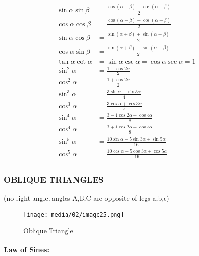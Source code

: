 \documentclass[
]{book}
\begin{document}
\begin{align}
\sin{\alpha}\sin{\beta} &= \frac{\cos\left(\alpha - \beta\right) - \cos\left(\alpha + \beta\right)}{2}\\
\cos{\alpha}\cos{\beta} &= \frac{\cos\left(\alpha - \beta\right) + \cos\left(\alpha + \beta\right)}{2}\\
\sin{\alpha}\cos{\beta} &= \frac{\sin\left(\alpha + \beta\right) + \sin\left(\alpha - \beta\right)}{2}\\
\cos{\alpha}\sin{\beta} &= \frac{\sin\left(\alpha + \beta\right) - \sin\left(\alpha - \beta\right)}{2}\\
\tan{\alpha}\cot{\alpha} &= \sin{\alpha}\csc{\alpha} = \cos{\alpha}\sec{\alpha} = 1\\
\sin^2{\alpha} &= \frac{1 - \cos{2\alpha}}{2}\\
\cos^2{\alpha} &= \frac{1 + \cos{2\alpha}}{2}\\
\sin^3{\alpha} &= \frac{3\sin{\alpha} - \sin{3\alpha}}{4}\\
\cos^3{\alpha} &= \frac{3\cos{\alpha} + \cos{3\alpha}}{4}\\
\sin^4{\alpha} &= \frac{3 - 4\cos{2\alpha} + \cos{4\alpha}}{8}\\
\cos^4{\alpha} &= \frac{3 + 4\cos{2\alpha} + \cos{4\alpha}}{8}\\
\sin^5{\alpha} &= \frac{10\sin{\alpha} - 5\sin{3\alpha} + \sin{5\alpha}}{16}\\
\cos^5{\alpha} &= \frac{10\cos{\alpha} + 5\cos{3\alpha} + \cos{5\alpha}}{16}\\
\end{align}

\hypertarget{oblique-triangles}{%
\subsubsection*{OBLIQUE TRIANGLES}\label{oblique-triangles}}

(no right angle, angles A,B,C are opposite of legs a,b,c)

\begin{figure}
\centering
\texttt{[image: media/02/image25.png]}
\caption{Oblique Triangle}
\end{figure}

\hypertarget{law-of-sines}{%
\paragraph*{Law of Sines:}\label{law-of-sines}}
\end{document}
